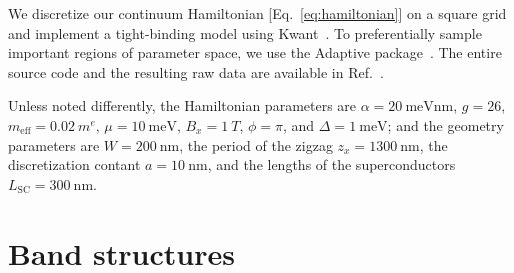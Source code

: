 \documentclass[english, twocolumn, 10pt, aps, superscriptaddress, floatfix, prb, citeautoscript]{revtex4-1}
\renewcommand{\comment}[2]{#2}
\begin{document}
\comment{We discretize the Hamiltonian and simulate it with Kwant.}
We discretize our continuum Hamiltonian [Eq.~\eqref{eq:hamiltonian}] on a square grid and implement a tight-binding model using Kwant~\cite{Groth2014}.
To preferentially sample important regions of parameter space, we use the Adaptive package~\cite{Nijholt2019}.
The entire source code and the resulting raw data are available in Ref.~.

\comment{The default parameters are ...}
Unless noted differently, the Hamiltonian parameters are $\alpha=\SI{20}{\meV \nm}$, $g=26$, $m_\text{eff}=\SI{0.02}{\electronmass}$, $\mu=\SI{10}{\meV}$, $B_x=\SI{1}{T}$, $\phi=\pi$, and $\Delta=\SI{1}{\meV}$; and the geometry parameters are $W=\SI{200}{\nm}$, the period of the zigzag $z_x=\SI{1300}{\nm}$, the discretization contant $a=\SI{10}{\nm}$, and the lengths of the superconductors $L_\textrm{SC}=\SI{300}{\nm}$.


\section{Band structures}\label{sec:band_structures}
\end{document}

